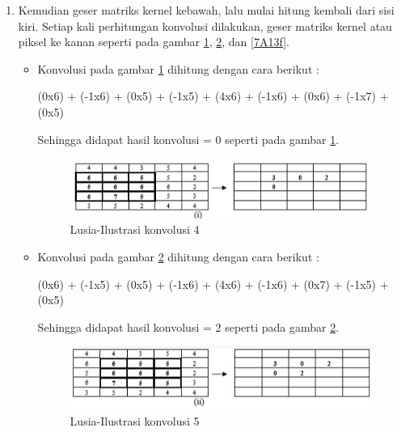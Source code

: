 \begin{enumerate}
\begin{enumerate}
	\item Kemudian geser matriks kernel kebawah, lalu mulai hitung kembali dari sisi kiri. Setiap kali perhitungan konvolusi dilakukan, geser matriks kernel atau piksel ke kanan seperti pada gambar \ref{7A13d}, \ref{7A13e}, dan \ref{7A13f}.
	\begin{itemize}
	\item Konvolusi pada gambar \ref{7A13d} dihitung dengan cara berikut :
	\par (0x6) + (-1x6) + (0x5) + (-1x5) + (4x6) + (-1x6) + (0x6) + (-1x7) + (0x5)   
	\par Sehingga didapat hasil konvolusi = 0 seperti pada gambar \ref{7A13d}.
		\begin{figure}[!hbtp]
		\centering
		\includegraphics[scale=0.4]{figures/v13d.jpg}
		\caption{Lusia-Ilustrasi konvolusi 4}
		\label{7A13d}
		\end{figure}
	\item Konvolusi pada gambar \ref{7A13e} dihitung dengan cara berikut :
	\par (0x6) + (-1x5) + (0x5) + (-1x6) + (4x6) + (-1x6) + (0x7) + (-1x5) + (0x5)   
	\par Sehingga didapat hasil konvolusi = 2 seperti pada gambar \ref{7A13e}.
		\begin{figure}[!hbtp]
		\centering
		\includegraphics[scale=0.4]{figures/v13e.jpg}
		\caption{Lusia-Ilustrasi konvolusi 5}
		\label{7A13e}
		\end{figure}
		

\end{itemize}
\end{enumerate}
\end{enumerate}
